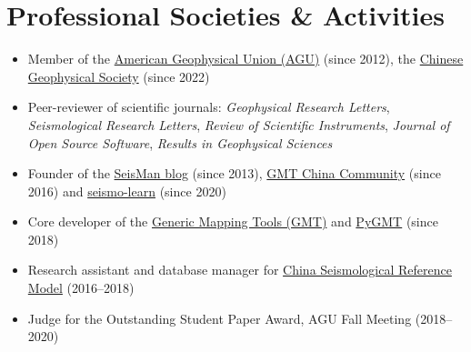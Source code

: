 \section{Professional Societies \& Activities}

\begin{itemize}
\item Member of the \href{https://sites.agu.org/}{American Geophysical Union (AGU)} (since 2012),
      the \href{http://www.cgscgs.org.cn/}{Chinese Geophysical Society} (since 2022)
\item Peer-reviewer of scientific journals:
      \emph{Geophysical Research Letters},
      \emph{Seismological Research Letters},
      \emph{Review of Scientific Instruments},
      \emph{Journal of Open Source Software},
      \emph{Results in Geophysical Sciences}
\item Founder of the \href{https://blog.seisman.info}{SeisMan blog} (since 2013),
      \href{http://gmt-china.org/}{GMT China Community} (since 2016)
      and \href{https://seismo-learn.org/}{seismo-learn} (since 2020)
\item Core developer of the \href{https://github.com/GenericMappingTools/gmt}{Generic Mapping Tools (GMT)} and
      \href{https://github.com/GenericMappingTools/pygmt}{PyGMT} (since 2018)
\item Research assistant and database manager for \href{http://chinageorefmodel.org/}{China Seismological Reference Model} (2016--2018)
\item Judge for the Outstanding Student Paper Award, AGU Fall Meeting (2018--2020)
\end{itemize}
